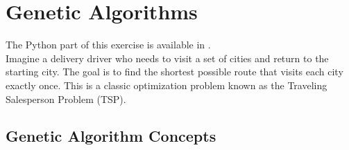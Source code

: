 \section{Genetic Algorithms}

The Python part of this exercise is available in .\\

Imagine a delivery driver who needs to visit a set of cities and return to the starting city. The goal is to find the shortest possible route that visits each city exactly once. This is a classic optimization problem known as the Traveling Salesperson Problem (TSP).

\subsection*{Genetic Algorithm Concepts}

